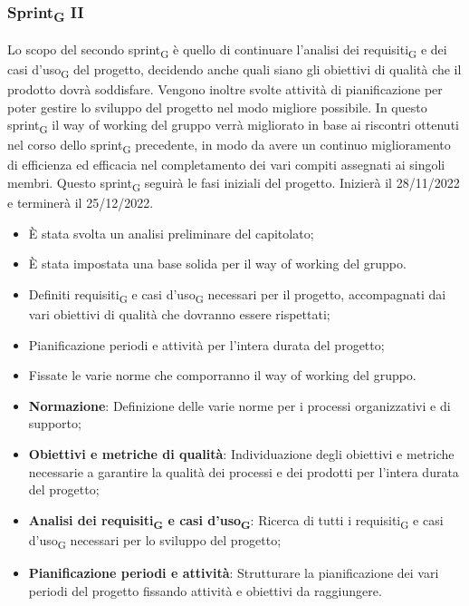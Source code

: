 \subsubsection{Sprint\textsubscript{G} II}\:
Lo scopo del secondo sprint\textsubscript{G} è quello di continuare l'analisi dei requisiti\textsubscript{G} e dei casi d'uso\textsubscript{G} del progetto, decidendo anche quali siano gli obiettivi di qualità che il prodotto dovrà soddisfare. Vengono inoltre svolte attività di pianificazione per poter gestire lo sviluppo del progetto nel modo migliore possibile. In questo sprint\textsubscript{G} il way of working del gruppo verrà migliorato in base ai riscontri ottenuti nel corso dello sprint\textsubscript{G} precedente, in modo da avere un continuo miglioramento di efficienza ed efficacia nel completamento dei vari compiti assegnati ai singoli membri.
Questo sprint\textsubscript{G} seguirà le fasi iniziali del progetto. Inizierà il 28/11/2022 e terminerà il 25/12/2022.

\:
\begin{itemize}
	\item È stata svolta un analisi preliminare del capitolato;
	\item È stata impostata una base solida per il way of working del gruppo.
\end{itemize}

\:
\begin{itemize}
	\item Definiti requisiti\textsubscript{G} e casi d'uso\textsubscript{G} necessari per il progetto, accompagnati dai vari obiettivi di qualità che dovranno essere rispettati;
	\item Pianificazione periodi e attività per l'intera durata del progetto;
	\item Fissate le varie norme che comporranno il way of working del gruppo.
\end{itemize}

\:
\begin{itemize}
	\item \textbf{Normazione}: Definizione delle varie norme per i processi organizzativi e di supporto;
	\item \textbf{Obiettivi e metriche di qualità}: Individuazione degli obiettivi e metriche necessarie a garantire la qualità dei processi e dei prodotti per l'intera durata del progetto;
	\item \textbf{Analisi dei requisiti\textsubscript{G} e casi d'uso\textsubscript{G}}: Ricerca di tutti i requisiti\textsubscript{G} e casi d'uso\textsubscript{G} necessari per lo sviluppo del progetto;
	\item \textbf{Pianificazione periodi e attività}: Strutturare la pianificazione dei vari periodi del progetto fissando attività e obiettivi da raggiungere.
\end{itemize}

